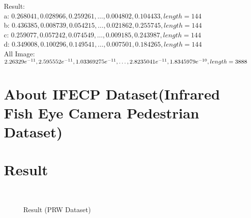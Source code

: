 \documentclass[12pt]{article}
\theoremstyle{plain}
\begin{document}
Result:\\
a: $0.268041, 0.028966, 0.259261, \ldots, 0.004802, 0.104433, length = 144$\\
b: $0.436385, 0.008739, 0.054215, \ldots, 0.021862, 0.255745, length = 144$\\
c: $0.259077, 0.057242, 0.074549, \ldots, 0.009185, 0.243987, length = 144$\\
d: $0.349008, 0.100296, 0.149541, \ldots, 0.007501, 0.184265, length = 144$\\[2ex]
All Image: $2.26329e^{-11}, 2.595552e^{-11}, 1.03369275e^{-11}, \ldots, 2.8235041e^{-11}, 1.8345979e^{-10}, \\length = 3888$



\section{About IFECP Dataset(Infrared Fish Eye Camera Pedestrian Dataset)}





\section{Result}
\begin{figure}[H]
\begin{multicols}{2}
\centering
{}

\\

\end{multicols}
\caption{Result (PRW Dataset)}
\end{figure}
\end{document}
